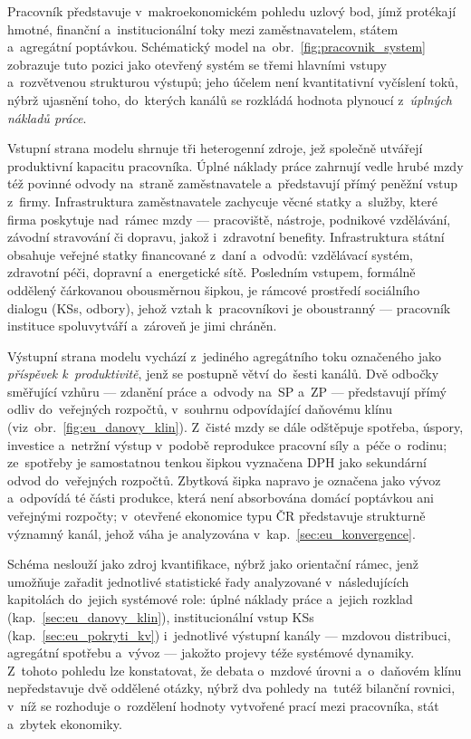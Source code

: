 Pracovník představuje v~makroekonomickém pohledu uzlový bod, jímž protékají hmotné, finanční a~institucionální toky mezi zaměstnavatelem, státem a~agregátní poptávkou.
Schématický model na~obr.~\ref{fig:pracovnik_system} zobrazuje tuto pozici jako otevřený systém se třemi hlavními vstupy a~rozvětvenou strukturou výstupů; jeho účelem není kvantitativní vyčíslení toků, nýbrž ujasnění toho, do~kterých kanálů se rozkládá hodnota plynoucí z~\textit{úplných nákladů práce}.

Vstupní strana modelu shrnuje tři heterogenní zdroje, jež společně utvářejí produktivní kapacitu pracovníka.
Úplné náklady práce zahrnují vedle hrubé mzdy též povinné odvody na~straně zaměstnavatele a~představují přímý peněžní vstup z~firmy.
Infrastruktura zaměstnavatele zachycuje věcné statky a~služby, které firma poskytuje nad~rámec mzdy --- pracoviště, nástroje, podnikové vzdělávání, závodní stravování či dopravu, jakož i~zdravotní benefity.
Infrastruktura státní obsahuje veřejné statky financované z~daní a~odvodů: vzdělávací systém, zdravotní péči, dopravní a~energetické sítě.
Posledním vstupem, formálně oddělený čárkovanou obousměrnou šipkou, je rámcové prostředí sociálního dialogu (\acsp{KS}, odbory), jehož vztah k~pracovníkovi je oboustranný --- pracovník instituce spoluvytváří a~zároveň je jimi chráněn.

Výstupní strana modelu vychází z~jediného agregátního toku označeného jako \textit{příspěvek k~produktivitě}, jenž se postupně větví do~šesti kanálů.
Dvě odbočky směřující vzhůru --- zdanění práce a~odvody na~\acs{SP} a~\acs{ZP} --- představují přímý odliv do~veřejných rozpočtů, v~souhrnu odpovídající daňovému klínu (viz~obr.~\ref{fig:eu_danovy_klin}).
Z~čisté mzdy se dále odštěpuje spotřeba, úspory, investice a~netržní výstup v~podobě reprodukce pracovní síly a~péče o~rodinu; ze~spotřeby je samostatnou tenkou šipkou vyznačena \acs{DPH} jako sekundární odvod do~veřejných rozpočtů.
Zbytková šipka napravo je označena jako vývoz a~odpovídá té části produkce, která není absorbována domácí poptávkou ani veřejnými rozpočty; v~otevřené ekonomice typu \ac{ČR} představuje strukturně významný kanál, jehož váha je analyzována v~kap.~\ref{sec:eu_konvergence}.

Schéma neslouží jako zdroj kvantifikace, nýbrž jako orientační rámec, jenž umožňuje zařadit jednotlivé statistické řady analyzované v~následujících kapitolách do~jejich systémové role: úplné náklady práce a~jejich rozklad (kap.~\ref{sec:eu_danovy_klin}), institucionální vstup \acsp{KS} (kap.~\ref{sec:eu_pokryti_kv}) i~jednotlivé výstupní kanály --- mzdovou distribuci, agregátní spotřebu a~vývoz --- jakožto projevy téže systémové dynamiky.
Z~tohoto pohledu lze konstatovat, že debata o~mzdové úrovni a~o~daňovém klínu nepředstavuje dvě oddělené otázky, nýbrž dva pohledy na~tutéž bilanční rovnici, v~níž se rozhoduje o~rozdělení hodnoty vytvořené prací mezi pracovníka, stát a~zbytek ekonomiky.


